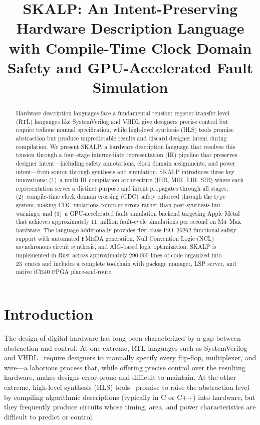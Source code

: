 \documentclass[conference]{IEEEtran}
\title{SKALP: An Intent-Preserving Hardware Description Language with Compile-Time Clock Domain Safety and GPU-Accelerated Fault Simulation}
\author{
  \IEEEauthorblockN{Shankar Giri V}
  \IEEEauthorblockA{
    \url{https://github.com/girivs82/skalp} \\
    \url{https://mikaana.com}
  }
}
\begin{document}
\maketitle

\begin{abstract}
Hardware description languages face a fundamental tension: register-transfer level (RTL) languages like SystemVerilog and VHDL give designers precise control but require tedious manual specification, while high-level synthesis (HLS) tools promise abstraction but produce unpredictable results and discard designer intent during compilation. We present SKALP, a hardware description language that resolves this tension through a four-stage intermediate representation (IR) pipeline that preserves designer intent---including safety annotations, clock domain assignments, and power intent---from source through synthesis and simulation. SKALP introduces three key innovations: (1)~a multi-IR compilation architecture (HIR, MIR, LIR, SIR) where each representation serves a distinct purpose and intent propagates through all stages; (2)~compile-time clock domain crossing (CDC) safety enforced through the type system, making CDC violations compiler errors rather than post-synthesis lint warnings; and (3)~a GPU-accelerated fault simulation backend targeting Apple Metal that achieves approximately 11~million fault-cycle simulations per second on M4~Max hardware. The language additionally provides first-class ISO~26262 functional safety support with automated FMEDA generation, Null Convention Logic (NCL) asynchronous circuit synthesis, and AIG-based logic optimization. SKALP is implemented in Rust across approximately 290,000 lines of code organized into 23~crates and includes a complete toolchain with package manager, LSP server, and native iCE40 FPGA place-and-route.
\end{abstract}

\section{Introduction}

The design of digital hardware has long been characterized by a gap between abstraction and control. At one extreme, RTL languages such as SystemVerilog~\cite{ieee1800} and VHDL~\cite{ieee1076} require designers to manually specify every flip-flop, multiplexer, and wire---a laborious process that, while offering precise control over the resulting hardware, makes designs error-prone and difficult to maintain. At the other extreme, high-level synthesis (HLS) tools~\cite{vivadohls,catapulthls} promise to raise the abstraction level by compiling algorithmic descriptions (typically in C or C++) into hardware, but they frequently produce circuits whose timing, area, and power characteristics are difficult to predict or control.
\end{document}
